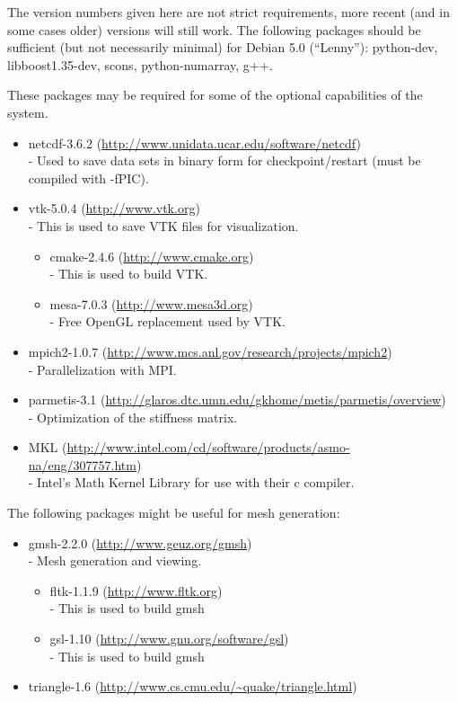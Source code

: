 The version numbers given here are not strict requirements, more recent (and in some cases older) versions will
still work. 
The following packages should be sufficient (but not necessarily minimal) for Debian 5.0 (``Lenny''):
python-dev, libboost1.35-dev, scons, python-numarray, g++.


These packages may be required for some of the optional capabilities of the system.

\begin{itemize}
 \item netcdf-3.6.2 (\url{http://www.unidata.ucar.edu/software/netcdf}) \\-
        Used to save data sets in binary form for checkpoint/restart (must be compiled with -fPIC).
\item vtk-5.0.4 (\url{http://www.vtk.org}) \\-
        This is used to save VTK files for visualization.
  \begin{itemize}
  \item cmake-2.4.6 (\url{http://www.cmake.org}) \\-
        This is used to build VTK.
  \item     mesa-7.0.3 (\url{http://www.mesa3d.org})\\-
        Free OpenGL replacement used by VTK.
  \end{itemize}

\item     mpich2-1.0.7 (\url{http://www.mcs.anl.gov/research/projects/mpich2}) \\-
        Parallelization with MPI.
\item     parmetis-3.1 (\url{http://glaros.dtc.umn.edu/gkhome/metis/parmetis/overview}) \\-
        Optimization of the stiffness matrix.
\item MKL (\url{http://www.intel.com/cd/software/products/asmo-na/eng/307757.htm}) \\-
        Intel's Math Kernel Library for use with their c compiler.
\end{itemize}

The following packages might be useful for mesh generation:
\begin{itemize}
 \item gmsh-2.2.0 (\url{http://www.geuz.org/gmsh}) \\-
    Mesh generation and viewing.
  \begin{itemize}
 \item fltk-1.1.9 (\url{http://www.fltk.org}) \\-
    This is used to build gmsh 
\item gsl-1.10 (\url{http://www.gnu.org/software/gsl}) \\-
    This is used to build gmsh 
\end{itemize}

\item triangle-1.6 (\url{http://www.cs.cmu.edu/~quake/triangle.html}) 
\end{itemize}

